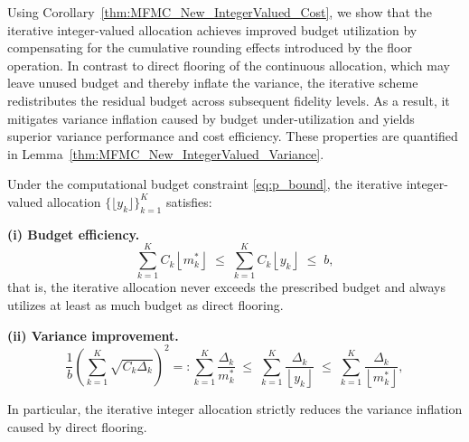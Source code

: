 Using Corollary~\ref{thm:MFMC_New_IntegerValued_Cost}, we show that the iterative integer-valued allocation achieves improved budget utilization by compensating for the cumulative rounding effects introduced by the floor operation. In contrast to direct flooring of the continuous allocation, which may leave unused budget and thereby inflate the variance, the iterative scheme redistributes the residual budget across subsequent fidelity levels. As a result, it mitigates variance inflation caused by budget under-utilization and yields superior variance performance and cost efficiency. These properties are quantified in Lemma~\ref{thm:MFMC_New_IntegerValued_Variance}.

\begin{lemma}
\label{thm:MFMC_New_IntegerValued_Variance}
Under the computational budget constraint \eqref{eq:p_bound}, the iterative integer-valued allocation $\{\lfloor y_k \rfloor\}_{k=1}^K$ satisfies:

\medskip
\noindent
\textbf{(i) Budget efficiency.}
\begin{equation}\label{eq:Iterative_integer_sample_size_cost_bound}
\sum_{k=1}^K C_k \left\lfloor m_k^* \right\rfloor
\;\le\;
\sum_{k=1}^K C_k \left\lfloor y_k \right\rfloor
\;\le\;
b,
\end{equation}
that is, the iterative allocation never exceeds the prescribed budget and always utilizes at least as much budget as direct flooring.

\medskip
\noindent
\textbf{(ii) Variance improvement.}
\begin{equation}\label{eq:Iterative_Integer_Variance_Bound}
\frac{1}{b}
\left(
\sum_{k=1}^K \sqrt{C_k \Delta_k}
\right)^2=:\sum_{k=1}^K \frac{\Delta_k}{m_k^*}
\;\le\;
\sum_{k=1}^K \frac{\Delta_k}{\left\lfloor y_k \right\rfloor}
\;\le\;
\sum_{k=1}^K \frac{\Delta_k}{\left\lfloor m_k^* \right\rfloor},
\end{equation}

In particular, the iterative integer allocation strictly reduces the variance inflation caused by direct flooring.


\end{lemma}







